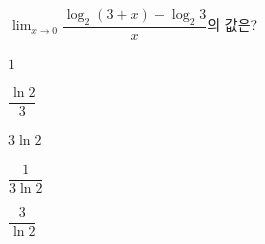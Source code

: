 $\displaystyle\lim_{x\to 0}\dfrac{\log_2(3+x)-\log_2 3}{x}$의 값은?
\begin{choices32}{\rule[-3ex]{0pt}{8ex}$1$}{\rule[-3ex]{0pt}{8ex}$\dfrac{\ln 2}{3}$}{\rule[-3ex]{0pt}{8ex}$3\ln 2$}{\rule[-3ex]{0pt}{8ex}$\dfrac{1}{3\ln 2}$}{\rule[-3ex]{0pt}{8ex}$\dfrac{3}{\ln 2}$}\end{choices32}
